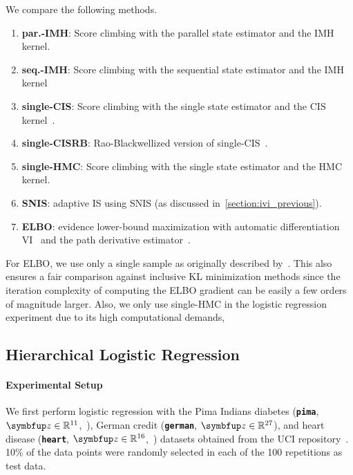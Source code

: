 We compare the following methods.
\vspace{-0.1in}
\begin{enumerate}[noitemsep]
  \item[\ding{182}] \textbf{par.-IMH}: Score climbing with the parallel state estimator and the IMH kernel. 
  \item[\ding{183}] \textbf{seq.-IMH}: Score climbing with the sequential state estimator and the IMH kernel 
  \item[\ding{184}] \textbf{single-CIS}: Score climbing with the single state estimator and the CIS kernel~\citep{NEURIPS2020_b2070693}.
  \item[\ding{185}] \textbf{single-CISRB}: Rao-Blackwellized version of single-CIS~\citep{NEURIPS2020_b2070693}.
  \item[\ding{184}] \textbf{single-HMC}: Score climbing with the single state estimator and the HMC kernel.
  \item[\ding{186}] \textbf{SNIS}: adaptive IS using SNIS (as discussed in~\cref{section:ivi_previous}).
  \item[\ding{187}] \textbf{ELBO}: evidence lower-bound maximization with automatic differentiation VI~\citep{pmlr-v33-ranganath14, JMLR:v18:16-107} and the path derivative estimator~\citep{NIPS2017_e91068ff}.
\end{enumerate}
\vspace{-0.05in}
For ELBO, we use only a single sample as originally described by~\citet{NIPS2017_e91068ff}.
This also ensures a fair comparison against inclusive KL minimization methods since the iteration complexity of computing the ELBO gradient can be easily a few orders of magnitude larger.
Also, we only use single-HMC in the logistic regression experiment due to its high computational demands, 


\subsection{Hierarchical Logistic Regression}\label{section:logistic}
\vspace{-0.05in}
\paragraph{Experimental Setup}
We first perform logistic regression with the Pima Indians diabetes (\textbf{\texttt{pima}}, \(\vz \in \mathbb{R}^{11}\),~\citealt{smith_using_1988}), German credit (\textbf{\texttt{german}}, \(\vz \in \mathbb{R}^{27}\)), and heart disease (\textbf{\texttt{heart}}, \(\vz \in \mathbb{R}^{16}\),~\citealt{detrano_international_1989}) datasets obtained from the UCI repository~\citep{Dua:2019}.
10\% of the data points were randomly selected in each of the 100 repetitions as test data.

